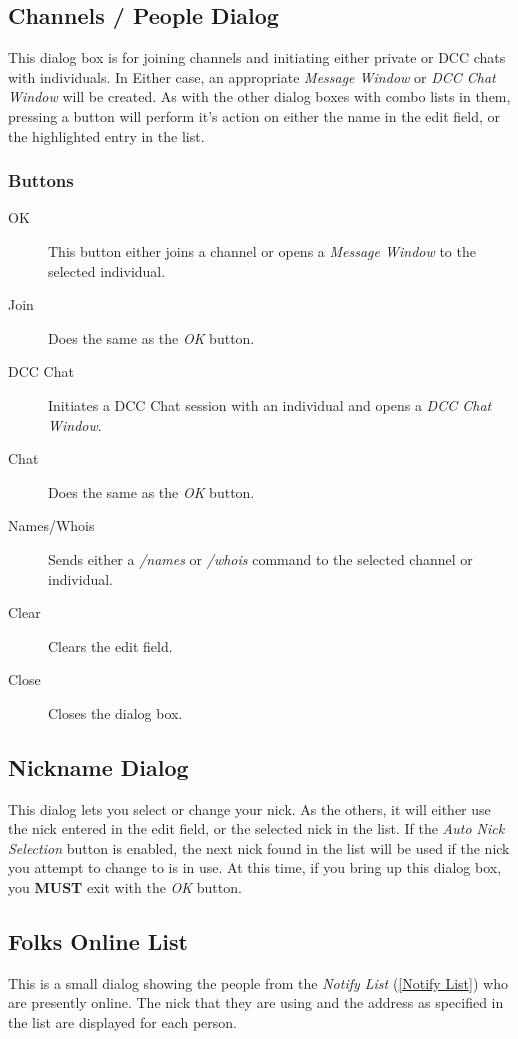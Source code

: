 \documentclass[titlepage]{article}
\begin{document}
\subsection{Channels / People Dialog}\label{Channel Select}
This dialog box is for joining channels and initiating either private
or DCC chats with individuals. In Either case, an appropriate
\textit{Message Window} or \textit{DCC Chat Window} will be created.
As with the other dialog boxes with combo lists in them, pressing a
button will perform it's action on either the name in the edit field,
or the highlighted entry in the list.

\subsubsection{Buttons}
\begin{description}
\item[OK] This button either joins a channel or opens a
\textit{Message Window} to the selected individual.
\item[Join] Does the same as the \textit{OK} button.
\item[DCC Chat] Initiates a DCC Chat session with an individual and
opens a \textit{DCC Chat Window}.
\item[Chat] Does the same as the \textit{OK} button.
\item[Names/Whois] Sends either a \textit{/names} or \textit{/whois}
command to the selected channel or individual.
\item[Clear] Clears the edit field.
\item[Close] Closes the dialog box.
\end{description}

\subsection{Nickname Dialog}
This dialog lets you select or change your nick. As the others, it
will either use the nick entered in the edit field, or the selected
nick in the list. If the \textit{Auto Nick Selection} button is
enabled, the next nick found in the list will be used if the nick you
attempt to change to is in use. At this time, if you bring up this
dialog box, you \textbf{MUST} exit with the \textit{OK} button.

\subsection{Folks Online List}\label{Folks Online}
This is a small dialog showing the people from the \emph{Notify List}
(\ref{Notify List}) who are presently online. The nick that they are using
and the address as specified in the list are displayed for each person.
\end{document}
